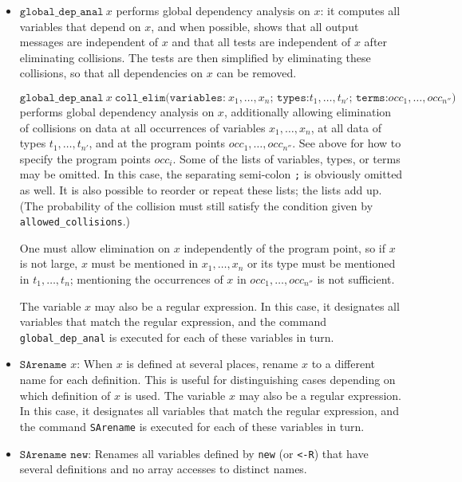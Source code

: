 \documentclass{article}
\begin{document}
\begin{itemize}
\item $\texttt{global\_dep\_anal}\ x$ performs global dependency
  analysis on $x$: it computes all variables that depend on $x$, and
  when possible, shows that all output messages are independent of $x$
  and that all tests are independent of $x$ after eliminating
  collisions. The tests are then simplified by eliminating these
  collisions, so that all dependencies on $x$ can be removed.

$\texttt{global\_dep\_anal}\ x\ \texttt{coll\_elim(variables:}\ x_1, \ldots, x_n\texttt{; types:}t_1, \ldots, t_{n'}\texttt{; terms:}occ_1, \ldots, occ_{n''}\texttt{)}$ 
performs global dependency analysis on $x$, 
additionally allowing elimination of collisions on data 
at all occurrences of variables
$x_1, \ldots, x_n$, at all data of types $t_1, \ldots, t_{n'}$,
and at the program points $occ_1, \ldots, occ_{n''}$.
See above for how to specify the program points $occ_i$. 
Some of the lists of variables, types, or terms may be omitted.
In this case, the separating semi-colon \texttt{;} is obviously
omitted as well. It is also possible to reorder or repeat these lists; the lists add up.
(The probability of the collision must still satisfy the
condition given by \texttt{allowed\string_collisions}.)

One must allow elimination on $x$ independently of the program point, 
so if $x$ is not large, $x$ must be mentioned in $x_1, \ldots, x_n$
or its type must be mentioned in $t_1, \ldots, t_n$;
mentioning the occurrences of $x$ in $occ_1, \ldots, occ_{n''}$
is not sufficient.

The variable $x$ may also be a regular expression.
In this case, it designates all variables that match the regular expression,
and the command \texttt{global\_dep\_anal} is executed for each of these variables in
turn.

\item $\texttt{SArename }x$: When $x$ is defined at several places,
rename $x$ to a different name for each definition. This is useful for
distinguishing cases depending on which definition of $x$ is used.
The variable $x$ may also be a regular expression.
In this case, it designates all variables that match the regular expression,
and the command \texttt{SArename} is executed for each of these variables in
turn.

\item $\texttt{SArename new}$: Renames all variables defined by \texttt{new}
  (or \texttt{<-R}) that have several definitions and no array accesses
  to distinct names.
  

\end{itemize}
\end{document}
